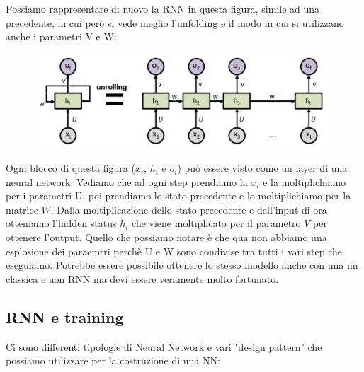 \documentclass[14pt]{extreport}
\begin{document}
Possiamo rappresentare di nuovo la RNN in questa figura, simile ad una precedente, in cui però si vede meglio l'unfolding e il modo in cui si
utilizzano anche i parametri V e W:

\begin{figure}[H]
	\centering
	\includegraphics[width=0.7\linewidth]{419.jpeg}
\end{figure}

Ogni blocco di questa figura ($x_i$, $h_i$ e $o_i$) può essere visto come un layer di una neural network. Vediamo che ad ogni step prendiamo la $x_i$
e la moltiplichiamo per i parametri U, poi prendiamo lo stato precedente e lo moltiplichiamo per la matrice $W$. Dalla moltiplicazione dello stato
precedente e dell'input di ora otteniamo l'hidden status $h_i$ che viene moltiplicato per il parametro $V$ per ottenere l'output. Quello che possiamo
notare è che qua non abbiamo una esplosione dei paraemtri perchè U e W sono condivise tra tutti i vari step che eseguiamo. Potrebbe essere possibile
ottenere lo stesso modello anche con una nn classica e non RNN ma devi essere veramente molto fortunato.


\subsection{RNN e training}

Ci sono differenti tipologie di Neural Network e vari "design pattern" che possiamo utilizzare per la costruzione di una NN:
\end{document}
